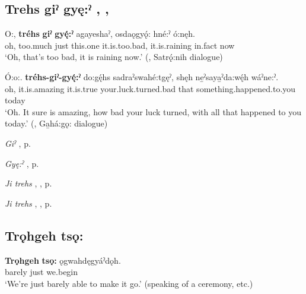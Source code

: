 \subsection*{\textbf{Trehs giˀ gyę:ˀ} , , } \label{p:[trehs giˀ gyę:ˀ]}

\ea
\label{ex:tpart107}
\gll O:, \textbf{tréhs} \textbf{giˀ} \textbf{gyę́:ˀ} agayeshaˀ, osdaǫgyǫ́: hné:ˀ ó:nęh.\\
oh, too.much just this.one it.is.too.bad, it.is.raining in.fact now\\
\glt ‘Oh, that’s too bad, it is raining now.’ (\cite[212]{mithun_watewayestanih_1984}, Satrǫ́:nih dialogue)
\z

\ea
\label{ex:tpart108}
\gll Ó:o:. \textbf{tréhs-giˀ-gyę́:ˀ} do:gę́hs sadraˀswahé:tgęˀ, shęh ne̱ˀsaya̱ˀda:wę́h wáˀne:ˀ.\\
oh, it.is.amazing it.is.true your.luck.turned.bad that something.happened.to.you today\\
\glt ‘Oh. It sure is amazing, how bad your luck turned, with all that happened to you today.’ (\cite[386]{mithun_watewayestanih_1984}, Ga̱há:gǫ: dialogue)
\z

\begin{CayugaRelated}
\item \textit{Giˀ} , p. \pageref{p:[giˀ]}\\
\item \textit{Gyę:ˀ} , p. \pageref{p:[gyę:ˀ]}\\
\item \textit{Ji trehs} , , p. \pageref{p:[ji trehs] ‘more (than usual)’}\\
\item \textit{Ji trehs} , , p. \pageref{p:[ji trehs] ‘because’}
\end{CayugaRelated}



\subsection*{\textbf{Trǫhgeh tsǫ:} } \label{p:[trǫhgeh tsǫ:]}

\ea
\label{ex:tpart109}
\gll \textbf{Trǫhgeh} \textbf{tsǫ:} ǫgwahdęgyáˀdǫh.\\
barely just we.begin\\
\glt ‘We’re just barely able to make it go.’ (speaking of a ceremony, etc.)
\z

